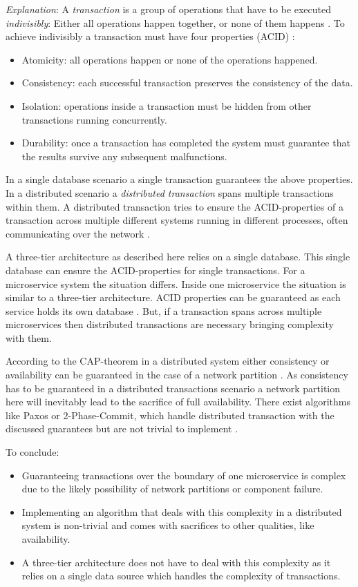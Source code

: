 \textit{Explanation}: 
A \textit{transaction} is a group of operations that have to be executed \textit{indivisibly}: Either all operations happen together, or none of them happens \citep[p. 289]{Haerder1983} \citep[p. 89]{Newman2015}.
To achieve indivisibly a transaction must have four properties (ACID) \citep[p. 289f]{Haerder1983}:
\begin{itemize}
\item Atomicity: all operations happen or none of the operations happened.
\item Consistency: each successful transaction preserves the consistency of the data.
\item Isolation: operations inside a transaction must be hidden from other transactions running concurrently.
\item Durability: once a transaction has completed the system must guarantee that the results survive any subsequent malfunctions.
\end{itemize}

In a single database scenario a single transaction guarantees the above properties.
In a distributed scenario a \textit{distributed transaction} spans multiple transactions within them. 
A distributed transaction tries to ensure the ACID-properties of a transaction across multiple different systems running in different processes, often communicating over the network \citep[p. 92]{Newman2015}.

A three-tier architecture as described here relies on a single database. 
This single database can ensure the ACID-properties for single transactions.
For a microservice system the situation differs.
Inside one microservice the situation is similar to a three-tier architecture.
ACID properties can be guaranteed as each service holds its own database \citep[p. 35]{Wolff2016}.
But, if a transaction spans across multiple microservices then distributed transactions are necessary bringing complexity with them.

According to the CAP-theorem in a distributed system either consistency or availability can be guaranteed in the case of a network partition \citep{Takada2013Abstractions}.
As consistency has to be guaranteed in a distributed transactions scenario a network partition here will inevitably lead to the sacrifice of full availability.
There exist algorithms like Paxos or 2-Phase-Commit, which handle distributed transaction with the discussed guarantees but are not trivial to implement \cite{Chandra2007}.

To conclude:
\begin{itemize}
\item Guaranteeing transactions over the boundary of one microservice is complex due to the likely possibility of network partitions or component failure.
\item Implementing an algorithm that deals with this complexity in a distributed system is non-trivial and comes with sacrifices to other qualities, like availability.
\item A three-tier architecture does not have to deal with this complexity as it relies on a single data source which handles the complexity of transactions.
\end{itemize}

